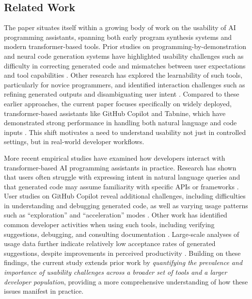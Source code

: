 \subsection{Related Work}
The paper situates itself within a growing body of work on the usability of AI programming assistants, spanning both early program synthesis systems and modern transformer-based tools. Prior studies on programming-by-demonstration and neural code generation systems have highlighted usability challenges such as difficulty in correcting generated code and mismatches between user expectations and tool capabilities \cite{ferdowsifard2020small,lin2017program}. Other research has explored the learnability of such tools, particularly for novice programmers, and identified interaction challenges such as refining generated outputs and disambiguating user intent \cite{jayagopal2022exploring,mcnutt2023design}. Compared to these earlier approaches, the current paper focuses specifically on widely deployed, transformer-based assistants like GitHub Copilot and Tabnine, which have demonstrated strong performance in handling both natural language and code inputs \cite{vaswani2017attention,xu2022systematic}. This shift motivates a need to understand usability not just in controlled settings, but in real-world developer workflows.

More recent empirical studies have examined how developers interact with transformer-based AI programming assistants in practice. Research has shown that users often struggle with expressing intent in natural language queries and that generated code may assume familiarity with specific APIs or frameworks \cite{xu2022inide}. User studies on GitHub Copilot reveal additional challenges, including difficulties in understanding and debugging generated code, as well as varying usage patterns such as “exploration” and “acceleration” modes \cite{vaithilingam2022expectation,barke2022grounded}. Other work has identified common developer activities when using such tools, including verifying suggestions, debugging, and consulting documentation \cite{mozannar2022reading}. Large-scale analyses of usage data further indicate relatively low acceptance rates of generated suggestions, despite improvements in perceived productivity \cite{ziegler2022productivity}. Building on these findings, the current study extends prior work by \textit{quantifying the prevalence and importance of usability challenges across a broader set of tools and a larger developer population}, providing a more comprehensive understanding of how these issues manifest in practice.

